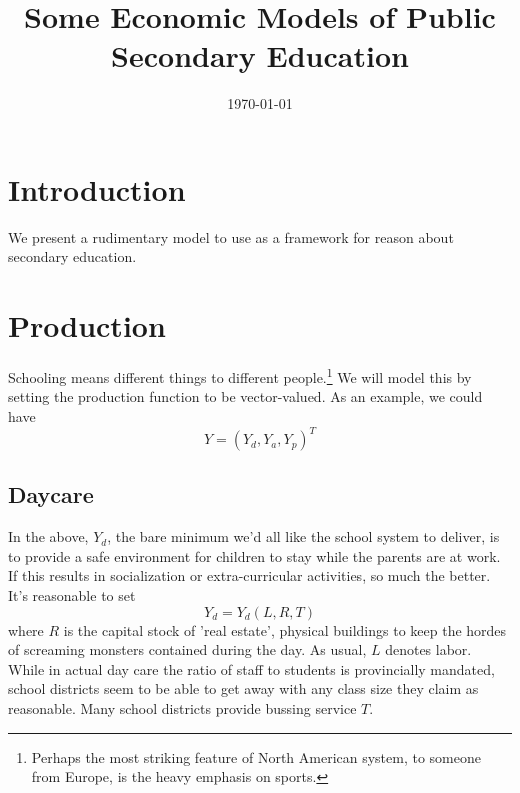 \documentclass{homework}
\date{\today}
\title{Some Economic Models of Public Secondary Education}
\begin{document}
 \maketitle

\section{Introduction}
We present a rudimentary model to use as a framework for reason about secondary education.

\section{Production}

Schooling means different things to different people.\footnote{Perhaps the most striking feature of North American system, to someone from Europe, is the heavy emphasis on sports.} We will model this by setting the production function to be vector-valued. As an example, we could have
\[ Y = (Y_d, Y_a, Y_p)^T\]

\subsection{Daycare} In the above, $Y_d$, the bare minimum we'd all like the school system to deliver, is to provide a safe environment for children to stay while the parents are at work. If this results in socialization or extra-curricular activities, so much the better. It's reasonable to set 
\[Y_d = Y_d(L,R,T)\]
where $R$ is the capital stock of 'real estate', physical buildings to keep the hordes of screaming monsters contained during the day. As usual, $L$ denotes labor. While in actual day care the ratio of staff to students is provincially mandated, school districts seem to be able to get away with any class size they claim as reasonable. Many school districts provide bussing service $T$.
\end{document}
